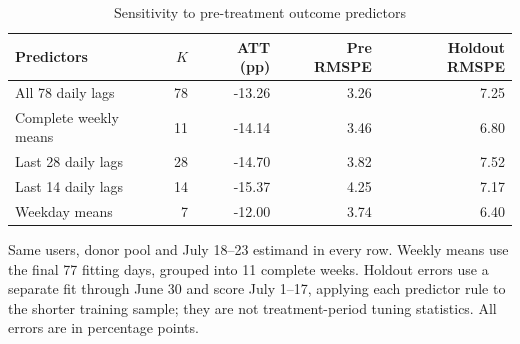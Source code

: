 \begin{table}[htbp]
\centering
\small
\caption{Sensitivity to pre-treatment outcome predictors}
\label{tab:advisor_lags}
\begin{threeparttable}
\begin{tabular}{@{}lrrrr@{}}
\toprule
Predictors & $K$ & ATT (pp) & Pre RMSPE & Holdout RMSPE \\
\midrule
All 78 daily lags & 78 & -13.26 & 3.26 & 7.25 \\
Complete weekly means & 11 & -14.14 & 3.46 & 6.80 \\
Last 28 daily lags & 28 & -14.70 & 3.82 & 7.52 \\
Last 14 daily lags & 14 & -15.37 & 4.25 & 7.17 \\
Weekday means & 7 & -12.00 & 3.74 & 6.40 \\
\bottomrule
\end{tabular}
\begin{tablenotes}[flushleft]
\footnotesize
\item Same users, donor pool and July 18--23 estimand in every row. Weekly means use the final 77 fitting days, grouped into 11 complete weeks. Holdout errors use a separate fit through June 30 and score July 1--17, applying each predictor rule to the shorter training sample; they are not treatment-period tuning statistics. All errors are in percentage points.
\end{tablenotes}
\end{threeparttable}
\end{table}
